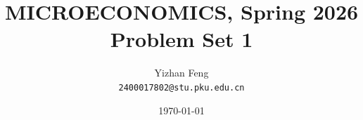 \title{\textbf{MICROECONOMICS, Spring 2026} \\[0.5em]
    \Large Problem Set 1}
\author{Yizhan Feng \\ 
    \normalsize{\texttt{2400017802@stu.pku.edu.cn}}}
\date{\today}